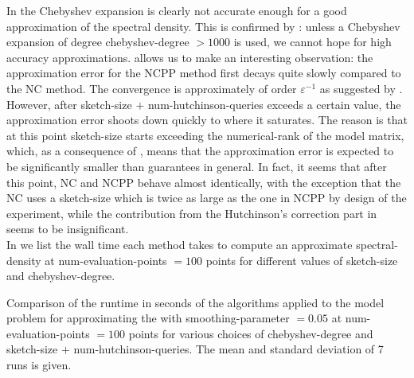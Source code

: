 In  the
Chebyshev expansion is clearly not accurate enough for a good approximation
of the spectral density. This is confirmed by :
unless a Chebyshev expansion of degree \gls{chebyshev-degree} $>1000$ is used,
we cannot hope for high accuracy approximations.
 allows us to
make an interesting observation: the approximation error for the \gls{NCPP} method
first decays quite slowly compared to the \gls{NC} method.
The convergence is approximately of order $\mathcal{\varepsilon^{-1}}$
as suggested by .
However, after \gls{sketch-size} $+$ \gls{num-hutchinson-queries}
exceeds a certain value, the approximation error shoots down quickly to where it
saturates. The reason is that at this point \gls{sketch-size} starts exceeding
the \gls{numerical-rank} of the model matrix, which, as a consequence of
, means that the approximation error is
expected to be significantly smaller than 
guarantees in general. In fact, it seems that after this point, \gls{NC} and \gls{NCPP}
behave almost identically, with the exception that the \gls{NC} uses 
a \gls{sketch-size} which is twice as large as the one in \gls{NCPP} by design
of the experiment, while the contribution from the Hutchinson's correction part
in  seems to be insignificant.\\

In  we list the wall time each method
takes to compute an approximate \gls{spectral-density} at \gls{num-evaluation-points} $=100$ points
for different values of \gls{sketch-size} and \gls{chebyshev-degree}.\\

\begin{table}[ht]
    \caption{Comparison of the runtime in seconds of the algorithms applied to the model problem
        for approximating the  with 
        \gls{smoothing-parameter} $=0.05$ at \gls{num-evaluation-points} $=100$
        points for various choices of \gls{chebyshev-degree} and \gls{sketch-size} $+$ \gls{num-hutchinson-queries}.
        The mean and standard deviation of 7 runs is given.}
    \label{tab:5-experiments-timing-DGC}
    
\end{table}

